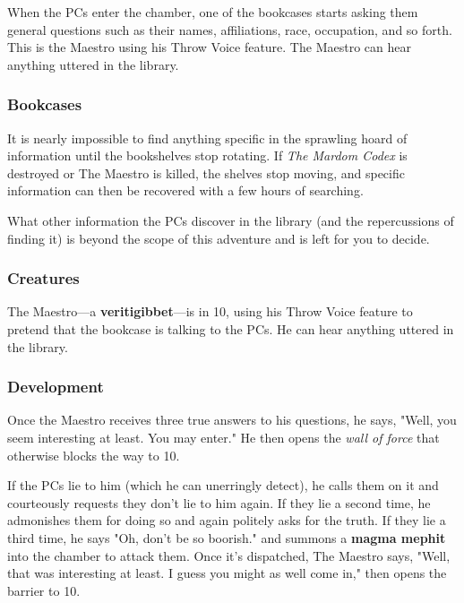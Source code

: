 \documentclass[10pt,a4paper,twoside,bg=print,twocolumn,openany,nodeprecatedcode]{dndbook}
\begin{document}
When the PCs enter the chamber, one of the bookcases starts asking them general questions such as their names, affiliations, race, occupation, and so forth. This is the Maestro using his Throw Voice feature. The Maestro can hear anything uttered in the library.

\subsubsection{Bookcases}
It is nearly impossible to find anything specific in the sprawling hoard of information until the bookshelves stop rotating. If \textit{The Mardom Codex} is destroyed or The Maestro is killed, the shelves stop moving, and specific information can then be recovered with a few hours of searching.

What other information the PCs discover in the library (and the repercussions of finding it) is beyond the scope of this adventure and is left for you to decide.

\subsubsection{Creatures}
The Maestro—a \textbf{veritigibbet}—is in 10, using his Throw Voice feature to pretend that the bookcase is talking to the PCs. He can hear anything uttered in the library.

\subsubsection{Development}
Once the Maestro receives three true answers to his questions, he says, "Well, you seem interesting at least. You may enter." He then opens the \textit{wall of force} that otherwise blocks the way to 10.

If the PCs lie to him (which he can unerringly detect), he calls them on it and courteously requests they don't lie to him again. If they lie a second time, he admonishes them for doing so and again politely asks for the truth. If they lie a third time, he says "Oh, don't be so boorish." and summons a \textbf{magma mephit} into the chamber to attack them. Once it's dispatched, The Maestro says, "Well, that was interesting at least. I guess you might as well come in," then opens the barrier to 10.
\end{document}
